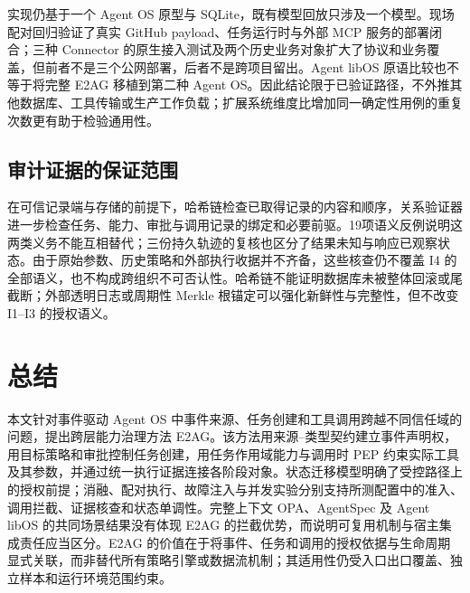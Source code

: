实现仍基于一个 Agent OS 原型与 SQLite，既有模型回放只涉及一个模型。现场配对回归验证了真实 GitHub payload、任务运行时与外部 MCP 服务的部署闭合；三种 Connector 的原生接入测试及两个历史业务对象扩大了协议和业务覆盖，但前者不是三个公网部署，后者不是跨项目留出。Agent libOS 原语比较也不等于将完整 E2AG 移植到第二种 Agent OS。因此结论限于已验证路径，不外推其他数据库、工具传输或生产工作负载；扩展系统维度比增加同一确定性用例的重复次数更有助于检验通用性。

\subsection{审计证据的保证范围}

在可信记录端与存储的前提下，哈希链检查已取得记录的内容和顺序，关系验证器进一步检查任务、能力、审批与调用记录的绑定和必要前驱。19项语义反例说明这两类义务不能互相替代；三份持久轨迹的复核也区分了结果未知与响应已观察状态。由于原始参数、历史策略和外部执行收据并不齐备，这些核查仍不覆盖 I4 的全部语义，也不构成跨组织不可否认性。哈希链不能证明数据库未被整体回滚或尾截断；外部透明日志或周期性 Merkle 根锚定可以强化新鲜性与完整性，但不改变 I1--I3 的授权语义。

\section{总结}\label{sec:conclusion-v11}

本文针对事件驱动 Agent OS 中事件来源、任务创建和工具调用跨越不同信任域的问题，提出跨层能力治理方法 E2AG。该方法用来源--类型契约建立事件声明权，用目标策略和审批控制任务创建，用任务作用域能力与调用时 PEP 约束实际工具及其参数，并通过统一执行证据连接各阶段对象。状态迁移模型明确了受控路径上的授权前提；消融、配对执行、故障注入与并发实验分别支持所测配置中的准入、调用拦截、证据核查和状态单调性。完整上下文 OPA、AgentSpec 及 Agent libOS 的共同场景结果没有体现 E2AG 的拦截优势，而说明可复用机制与宿主集成责任应当区分。E2AG 的价值在于将事件、任务和调用的授权依据与生命周期显式关联，而非替代所有策略引擎或数据流机制；其适用性仍受入口出口覆盖、独立样本和运行环境范围约束。

